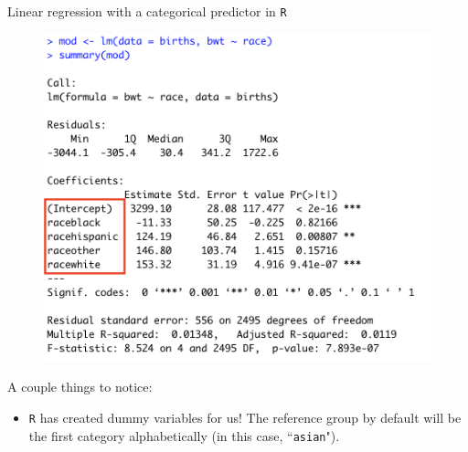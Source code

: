 \documentclass[10pt,t]{beamer}
\begin{document}
\begin{frame}{Linear regression with a categorical predictor in \texttt{R}}

\begin{figure}
	\centering \includegraphics[scale=0.3]{figures/multilevel_cat_lm2.png}
\end{figure}

\vspace{0.1cm}

A couple things to notice:
\begin{itemize}
	\item \texttt{R} has created dummy variables for us! The reference group by default will be the first category alphabetically (in this case, ``\texttt{asian}").
\end{itemize}

\end{frame}
\end{document}
